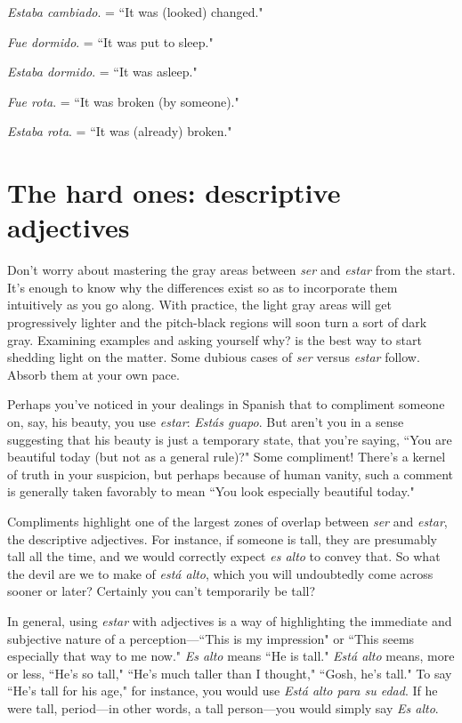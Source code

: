 \indu \emph{Estaba cambiado}. = ``It was (looked) changed."

\indu \emph{Fue dormido}. = ``It was put to sleep."

\indu \emph{Estaba dormido}. = ``It was asleep."

\indu \emph{Fue rota}. = ``It was broken (by someone)."

\indu \emph{Estaba rota}. = ``It was (already) broken."

\section{The hard ones: descriptive adjectives}

Don't worry about mastering the gray areas between \emph{ser} and
\emph{estar} from the start. It's enough to know why the differences exist so
as to incorporate them intuitively as you go along. With practice, the
light gray areas will get progressively lighter and the pitch-black regions will soon turn a sort of dark gray. Examining examples and asking yourself why? is the best way to start shedding light on the matter.
Some dubious cases of \emph{ser} versus \emph{estar} follow. Absorb them at your
own pace.

Perhaps you've noticed in your dealings in Spanish that to compliment someone on, say, his beauty, you use \emph{estar}: \emph{Estás guapo}. But
aren't you in a sense suggesting that his beauty is just a temporary
state, that you're saying, ``You are beautiful today (but not as a general
rule)?" Some compliment! There's a kernel of truth in your suspicion,
but perhaps because of human vanity, such a comment is generally
taken favorably to mean ``You look especially beautiful today."

Compliments highlight one of the largest zones of overlap between \emph{ser} and \emph{estar}, the descriptive adjectives. For instance, if someone is tall, they are presumably tall all the time, and we would correctly expect \emph{es alto} to convey that. So what the devil are we to make
of \emph{está alto}, which you will undoubtedly come across sooner or later?
Certainly you can't temporarily be tall?

In general, using \emph{estar} with adjectives is a way of highlighting
the immediate and subjective nature of a perception---``This is my
impression" or ``This seems especially that way to me now." \emph{Es alto}
means ``He is tall." \emph{Está alto} means, more or less, ``He's so tall," ``He's
much taller than I thought," ``Gosh, he's tall." To say ``He's tall for his
age," for instance, you would use \emph{Está alto para su edad}. If he were
tall, period---in other words, a tall person---you would simply say
\emph{Es alto}.

